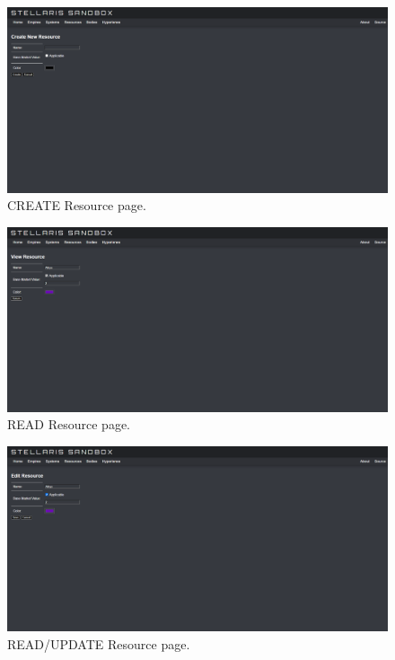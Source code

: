 \documentclass[12pt]{article}
\begin{document}
\begin{figure}[!ht]
  \caption{CREATE Resource page.}
  \includegraphics[width=\textwidth]{screenshots/resources/resources_create.png}
\end{figure}

\begin{figure}[!ht]
  \caption{READ Resource page.}
  \includegraphics[width=\textwidth]{screenshots/resources/resources_read.png}
\end{figure}

\begin{figure}[!ht]
  \caption{READ/UPDATE Resource page.}
  \includegraphics[width=\textwidth]{screenshots/resources/resources_read_update.png}
\end{figure}
\end{document}
